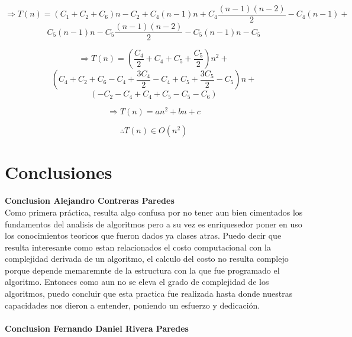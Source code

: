 \documentclass[12pt,twoside]{article}
\begin{document}
\[\Rightarrow T(n) = (C_{1} + C_{2} + C_{6})n - C_{2} +  
C_{4}(n-1)n + 
C_{4}\frac{(n-1)(n-2)}{2} - C_{4}(n-1) +\]\[
C_{5}(n-1)n -  
C_{5}\frac{(n-1)(n-2)}{2} - C_{5}(n-1)n - 
C_{5}\]


\[\Rightarrow T(n) = (\frac{C_{4}}{2} + C_{4} + C_{5} + \frac{C_{5}}{2})n^{2} + \]\[
(C_{4} + C_{2} + C_{6} - C_{4} + \frac{3C_{4}}{2} - C_{4} + C_{5} + \frac{3C_{5}}{2} -C_{5})n +\]\[
(- C_{2} - C_{4} + C_{4} + C_{5} - C_{5} - C_{6})\]

\[\Rightarrow T(n)= an^2 +bn + c\]

\[\therefore T(n) \in O(n^2) \]
\newpage
\section{Conclusiones}
\textbf{Conclusion Alejandro Contreras Paredes}\\

Como primera práctica, resulta algo confusa por no tener aun bien cimentados 
los fundamentos del analisis de algoritmos pero a su vez es enriquesedor poner en uso 
los conocimientos teoricos que fueron dados ya clases atras. Puedo decir que resulta interesante 
como estan relacionados el costo computacional con la complejidad derivada de un algoritmo, el calculo del costo
no resulta complejo porque depende memaremnte de la estructura con la que fue programado el algoritmo. Entonces
como aun no se eleva el grado de complejidad de los algoritmos, puedo concluir que esta practica fue realizada 
hasta donde nuestras capacidades nos dieron a entender, poniendo un esfuerzo y dedicación.
\\\\
\textbf{Conclusion Fernando Daniel Rivera Paredes}\\
\end{document}
